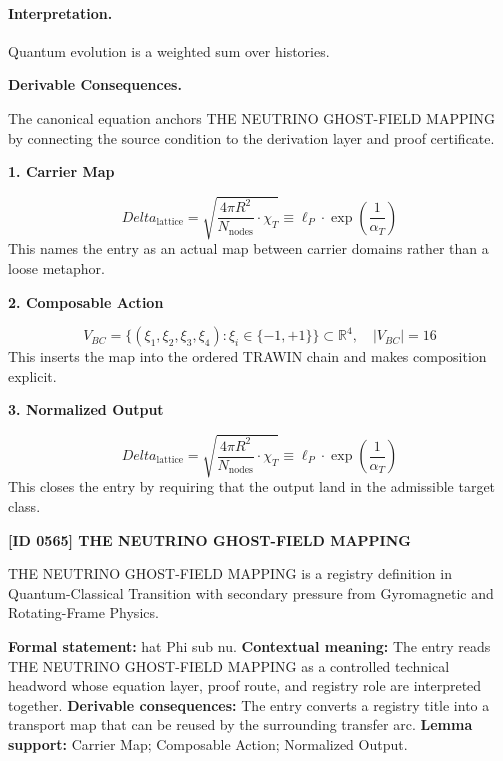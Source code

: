 \paragraph{Interpretation.}
Quantum evolution is a weighted sum over histories.

\par\vspace{0.35em}
\noindent\textbf{Derivable Consequences.}\quad
\begingroup
\footnotesize
\raggedright
The canonical equation anchors THE NEUTRINO GHOST-FIELD MAPPING by connecting the source condition to the derivation layer and proof certificate.
\par\endgroup

\noindent\textbf{1. Carrier Map}\par
\[
Delta_{\text{lattice}} = \sqrt{\frac{4\pi R^2}{N_{\text{nodes}}} \cdot \chi_T} \equiv \ell_P \cdot \exp\left( \frac{1}{\alpha_T} \right)
\]
\noindent This names the entry as an actual map between carrier domains rather than a loose metaphor.\par
\noindent\textbf{2. Composable Action}\par
\[
V_{BC} = \{ (\xi_1, \xi_2, \xi_3, \xi_4) : \xi_i \in \{ -1, +1 \} \} \subset \mathbb{R}^4, \quad |V_{BC}| = 16
\]
\noindent This inserts the map into the ordered TRAWIN chain and makes composition explicit.\par
\noindent\textbf{3. Normalized Output}\par
\[
Delta_{\text{lattice}} = \sqrt{\frac{4\pi R^2}{N_{\text{nodes}}} \cdot \chi_T} \equiv \ell_P \cdot \exp\left( \frac{1}{\alpha_T} \right)
\]
\noindent This closes the entry by requiring that the output land in the admissible target class.\par

\clearpage
\noindent\textbf{[ID 0565] THE NEUTRINO GHOST-FIELD MAPPING}\par
\vspace{0.35em}
\begingroup\small
{}
THE NEUTRINO GHOST-FIELD MAPPING is a registry definition in Quantum-Classical Transition with secondary pressure from Gyromagnetic and Rotating-Frame Physics.

\begingroup\footnotesize\setlength{\emergencystretch}{3em}\sloppy
\textbf{Formal statement:} hat Phi sub nu. \textbf{Contextual meaning:} The entry reads THE NEUTRINO GHOST-FIELD MAPPING as a controlled technical headword whose equation layer, proof route, and registry role are interpreted together. \textbf{Derivable consequences:} The entry converts a registry title into a transport map that can be reused by the surrounding transfer arc. \textbf{Lemma support:} Carrier Map; Composable Action; Normalized Output.\par
\endgroup

